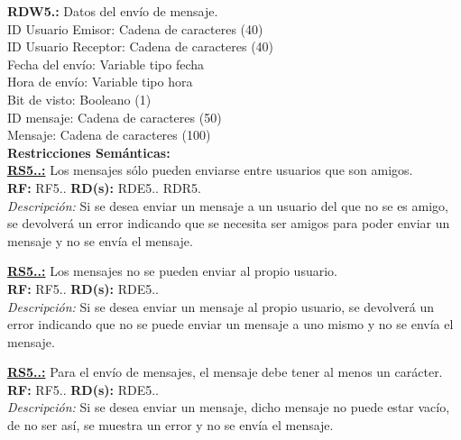 \textcolor{azul}{\textbf{RDW5.\theRDW:}} Datos del envío de mensaje. \\
\hspace*{1cm} ID Usuario Emisor: Cadena de caracteres (40) \\
\hspace*{1cm} ID Usuario Receptor: Cadena de caracteres (40) \\
\hspace*{1cm} Fecha del envío: Variable tipo fecha \\
\hspace*{1cm} Hora de envío: Variable tipo hora \\
\hspace*{1cm} Bit de visto: Booleano (1)\\
\hspace*{1cm} ID mensaje: Cadena de caracteres (50) \\
\hspace*{1cm} Mensaje: Cadena de caracteres (100) \\[12pt]


 \setcounter{RS}{1}
\textbf{\textcolor{verde}{Restricciones Semánticas:}} \\[6pt]
\textbf{\textcolor{verde}{\underline{RS5.\theRF.\theRS:}}} Los mensajes sólo pueden enviarse entre usuarios que son amigos. \\
\textbf{RF:} RF5.\theRF. \textbf{RD(s):} RDE5.\theRDE. RDR5.\theRDR \\
\hspace*{1cm} \textit{Descripción:} Si se desea enviar un mensaje a un usuario del que no se es amigo, se devolverá un error indicando que se necesita ser amigos para poder enviar un mensaje y no se envía el mensaje. \\[6pt]

\textbf{\textcolor{verde}{\underline{RS5.\theRF.\theRS:}}} Los mensajes no se pueden enviar al propio usuario. \\
\textbf{RF:} RF5.\theRF. \textbf{RD(s):} RDE5.\theRDE. \\
\hspace*{1cm} \textit{Descripción:} Si se desea enviar un mensaje al propio usuario, se devolverá un error indicando que no se puede enviar un mensaje a uno mismo y no se envía el mensaje. \\[6pt]

\textbf{\textcolor{verde}{\underline{RS5.\theRF.\theRS:}}} Para el envío de mensajes, el mensaje debe tener al menos un carácter. \\
\textbf{RF:} RF5.\theRF. \textbf{RD(s):} RDE5.\theRDE. \\
\hspace*{1cm} \textit{Descripción:} Si se desea enviar un mensaje, dicho mensaje no puede estar vacío, de no ser así, se muestra un error y no se envía el mensaje. \\ [6pt]

